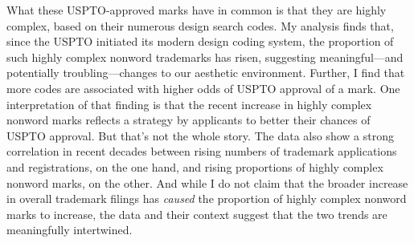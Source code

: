 \documentclass[letterpaper, 11pt, oneside]{article}
\begin{document}
\noindent What these USPTO-approved marks have in common is that they are highly complex, based on their numerous design search codes. My analysis finds that, since the USPTO initiated its modern design coding system, the proportion of such highly complex nonword trademarks has risen, suggesting meaningful—and potentially troubling—changes to our aesthetic environment. Further, I find that more codes are associated with higher odds of USPTO approval of a mark. One interpretation of that finding is that the recent increase in highly complex nonword marks reflects a strategy by applicants to better their chances of USPTO approval. But that's not the whole story. The data also show a strong correlation in recent decades between rising numbers of trademark applications and registrations, on the one hand, and rising proportions of highly complex nonword marks, on the other. And while I do not claim that the broader increase in overall trademark filings has \emph{caused} the proportion of highly complex nonword marks to increase, the data and their context suggest that the two trends are meaningfully intertwined. 
\end{document}
